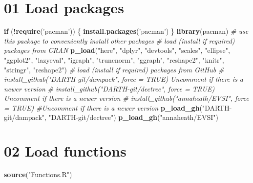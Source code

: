 \documentclass[
]{article}
\newenvironment{Shaded}{\begin{snugshade}}{\end{snugshade}}
\newcommand{\CommentTok}[1]{\textcolor[rgb]{0.56,0.35,0.01}{\textit{#1}}}
\newcommand{\ControlFlowTok}[1]{\textcolor[rgb]{0.13,0.29,0.53}{\textbf{#1}}}
\newcommand{\KeywordTok}[1]{\textcolor[rgb]{0.13,0.29,0.53}{\textbf{#1}}}
\newcommand{\NormalTok}[1]{#1}
\newcommand{\OperatorTok}[1]{\textcolor[rgb]{0.81,0.36,0.00}{\textbf{#1}}}
\newcommand{\StringTok}[1]{\textcolor[rgb]{0.31,0.60,0.02}{#1}}
\begin{document}
\hypertarget{load-packages}{%
\section{01 Load packages}\label{load-packages}}

\begin{Shaded}
\begin{Highlighting}[]
\ControlFlowTok{if}\NormalTok{ (}\OperatorTok{!}\KeywordTok{require}\NormalTok{(}\StringTok{'pacman'}\NormalTok{)) \{}
  \KeywordTok{install.packages}\NormalTok{(}\StringTok{'pacman'}\NormalTok{)}
\NormalTok{\}}
\KeywordTok{library}\NormalTok{(pacman) }\CommentTok{# use this package to conveniently install other packages}
\CommentTok{# load (install if required) packages from CRAN}
\KeywordTok{p_load}\NormalTok{(}\StringTok{"here"}\NormalTok{, }\StringTok{"dplyr"}\NormalTok{, }\StringTok{"devtools"}\NormalTok{, }\StringTok{"scales"}\NormalTok{, }\StringTok{"ellipse"}\NormalTok{, }\StringTok{"ggplot2"}\NormalTok{, }\StringTok{"lazyeval"}\NormalTok{, }
       \StringTok{"igraph"}\NormalTok{, }\StringTok{"truncnorm"}\NormalTok{, }\StringTok{"ggraph"}\NormalTok{, }\StringTok{"reshape2"}\NormalTok{, }\StringTok{"knitr"}\NormalTok{, }\StringTok{"stringr"}\NormalTok{, }\StringTok{"reshape2"}\NormalTok{)                                            }
\CommentTok{# load (install if required) packages from GitHub}
\CommentTok{# install_github("DARTH-git/dampack", force = TRUE) Uncomment if there is a newer version}
\CommentTok{# install_github("DARTH-git/dectree", force = TRUE) Uncomment if there is a newer version}
\CommentTok{# install_github("annaheath/EVSI", force = TRUE) #Uncomment if there is a newer version}
\KeywordTok{p_load_gh}\NormalTok{(}\StringTok{"DARTH-git/dampack"}\NormalTok{, }\StringTok{"DARTH-git/dectree"}\NormalTok{)}
\KeywordTok{p_load_gh}\NormalTok{(}\StringTok{"annaheath/EVSI"}\NormalTok{)}
\end{Highlighting}
\end{Shaded}

\hypertarget{load-functions}{%
\section{02 Load functions}\label{load-functions}}

\begin{Shaded}
\begin{Highlighting}[]
\KeywordTok{source}\NormalTok{(}\StringTok{"Functions.R"}\NormalTok{)}
\end{Highlighting}
\end{Shaded}
\end{document}
